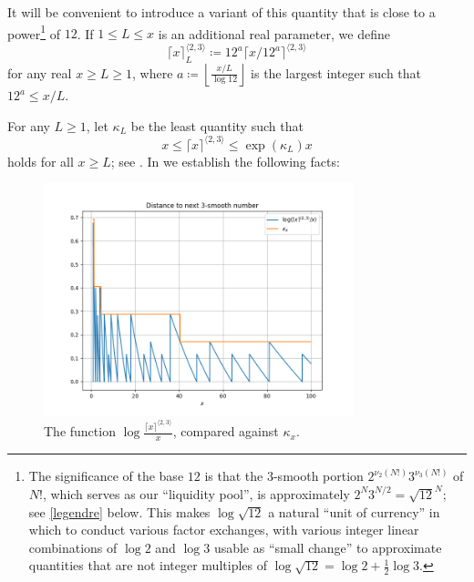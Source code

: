 \documentclass[12pt,a4paper,reqno]{amsart}
\numberwithin{equation}{section}
\theoremstyle{plain}
\theoremstyle{definition}
\begin{document}
It will be convenient to introduce a variant of this quantity that is close to a power\footnote{The significance of the base $12$ is that the $3$-smooth portion $2^{\nu_2(N!)} 3^{\nu_3(N!)}$ of $N!$, which serves as our ``liquidity pool'', is approximately $2^N 3^{N/2} = \sqrt{12}^{N}$; see \eqref{legendre} below.  This makes $\log \sqrt{12}$ a natural ``unit of currency'' in which to conduct various factor exchanges, with various integer linear combinations of $\log 2$ and $\log 3$ usable as ``small change'' to approximate quantities that are not integer multiples of $\log \sqrt{12} = \log 2 + \frac{1}{2} \log 3$.} of $12$.  If $1 \leq L \leq x$ is an additional real parameter, we define
\begin{equation}\label{fancy-kappa-def}
  \lceil x \rceil^{\langle 2,3\rangle}_L \coloneqq 12^a \lceil x/12^a \rceil^{\langle 2,3 \rangle}
\end{equation}
for any real $x \geq L \geq 1$, where $a \coloneqq \left\lfloor \frac{x/L}{\log 12} \right\rfloor$ is the largest integer such that $12^a \leq x/L$.

For any $L \geq 1$, let $\kappa_L$ be the least quantity such that
\begin{equation}\label{kappa-def}  
  x \leq \lceil x \rceil^{\langle 2,3\rangle} \leq \exp(\kappa_L) x 
\end{equation}
holds for all $x \geq L$; see .  In  we establish the following facts:

\begin{figure}
  \centering
  \includegraphics[width=0.8\textwidth]{next_smooth.png}
  \caption{The function $\log \frac{\lceil x \rceil^{\langle 2,3 \rangle}}{x}$, compared against $\kappa_x$. 
  }\label{fig:nextsmooth}
  \end{figure}
\end{document}
